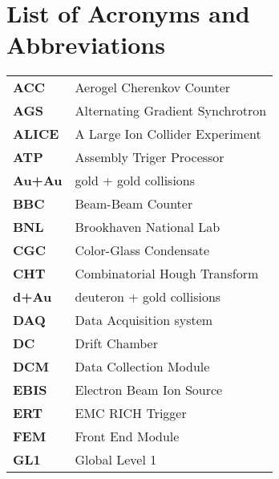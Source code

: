 \chapter{List of Acronyms and Abbreviations} %
\label{abbrev}

\begin{center}
\begin{longtable}{l   | l}  
\textbf{ACC}       & Aerogel Cherenkov Counter                                           \\ 
\textbf{AGS}       & Alternating Gradient Synchrotron                                    \\
\textbf{ALICE}     & A Large Ion Collider Experiment                                     \\
\textbf{ATP}       & Assembly Triger Processor                                           \\
\textbf{Au+Au}     & gold + gold collisions                                              \\
\textbf{BBC}       & Beam-Beam Counter                                                   \\
\textbf{BNL}       & Brookhaven National Lab                                             \\
\textbf{CGC}       & Color-Glass Condensate                                              \\
\textbf{CHT}       & Combinatorial Hough Transform                                       \\
\textbf{d+Au}      & deuteron + gold collisions                                          \\
\textbf{DAQ}       & Data Acquisition system                                             \\
\textbf{DC}        & Drift Chamber                                                       \\
\textbf{DCM}       & Data Collection Module                                              \\
\textbf{EBIS}      & Electron Beam Ion Source                                            \\
\textbf{ERT}       & EMC RICH Trigger                                                    \\
\textbf{FEM}       & Front End Module                                                    \\
\textbf{GL1}       & Global Level 1                                                      \\

\end{longtable}
\end{center}
